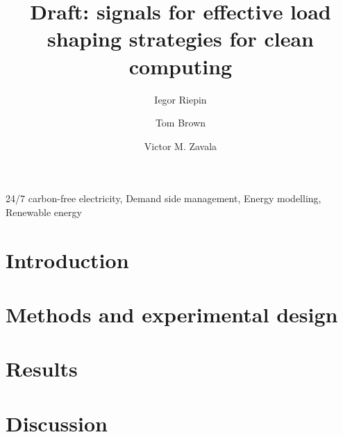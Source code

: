 \documentclass[11pt, 5p, nopreprintline]{elsarticle}
\begin{document}
\begin{frontmatter}

	\title{Draft: signals for effective load shaping strategies for clean computing}

	\author[tubaddress]{Iegor Riepin}
	\author[tubaddress]{Tom Brown}
	\author[wiaddress]{Victor M. Zavala}

	\address[tubaddress]{Department of Digital Transformation in Energy Systems, TU Berlin, Germany}
	\address[wiaddress]{Department of Chemical and Biological Engineering, University of Wisconsin-Madison, USA}


	\begin{abstract}
		
	\end{abstract}

	\begin{keyword}
		24/7 carbon-free electricity,
		Demand side management,
		Energy modelling,
		Renewable energy
	\end{keyword}


\end{frontmatter}

\tableofcontents

\section{Introduction}
\label{sec:intro}


\section{Methods and experimental design}
\label{sec:methods}


\section{Results}
\label{sec:results}


\section{Discussion}
\label{sec:discussion}

\end{document}
